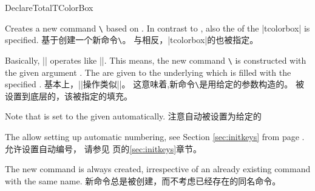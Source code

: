 \begin{docCommand}{DeclareTotalTColorBox}{}
\begin{stripedbox}
Creates a new command \texttt{\textbackslash} based on .
In contrast to , also the  of the |tcolorbox| is specified.
\tcblower
基于创建一个新命令\texttt{\textbackslash}。%
与相反，|tcolorbox|的也被指定。
\end{stripedbox}
  
  
\begin{stripedbox}
Basically, |\DeclareTotalTColorBox| operates like |\DeclareDocumentCommand|. This means,
the new command \texttt{\textbackslash} is constructed with the given argument .
The  are given to the underlying  which is filled with
the specified .
\tcblower
基本上，|\DeclareTotalTColorBox|操作类似|\DeclareDocumentCommand|。%
这意味着,新命令\texttt{\textbackslash}是用给定的参数构造的。%
被设置到底层的，该被指定的填充。
\end{stripedbox}
  
\begin{stripedbox}
Note that  is set to the given 
automatically.
\tcblower
注意自动被设置为给定的
\end{stripedbox}

\begin{stripedbox}
The  allow setting up automatic numbering,
see Section \ref{sec:initkeys} from page \pageref{sec:initkeys}.
\tcblower
{}允许设置自动编号，
请参见 \pageref{sec:initkeys}页的\ref{sec:initkeys}章节。
\end{stripedbox}

\begin{stripedbox}
The new command is always created, irrespective of an already existing
command with the same name.
\tcblower
新命令总是被创建，而不考虑已经存在的同名命令。
\end{stripedbox}

\end{docCommand}

